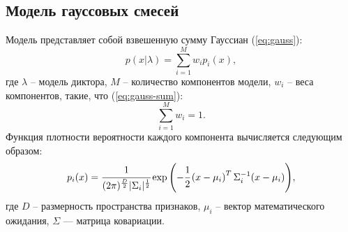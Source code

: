 \subsection{Модель гауссовых смесей}
Модель представляет собой взвешенную сумму Гауссиан (\ref{eq:gauss}):
\begin{equation}\label{eq:gauss}
    p(x | \lambda) = \sum^{M}_{i = 1}w_ip_i(x),
\end{equation}
где $\lambda$ -- модель диктора, $M$ -- количество компонентов модели, $w_i$ -- веса компонентов, такие, что (\ref{eq:gauss-sum}):
\begin{equation}\label{eq:gauss-sum}
     \sum^{M}_{i = 1}w_i = 1.
\end{equation}
Функция плотности вероятности каждого компонента вычисляется следующим образом:
\begin{equation}\label{eq:gauss-prob}
     p_i(x) = \cfrac{1}{(2\pi)^{\frac{D}{2}} |\Sigma_i|^{\frac{1}{2}}}
     \exp{\left(-\cfrac{1}{2}\left(x - \mu_i\right)^T\Sigma_{i}^{-1}(x - \mu_i)\right)},
\end{equation}
где $D$ -- размерность пространства признаков, $\mu_i$ -- вектор математического ожидания, $\Sigma$ — матрица ковариации.
